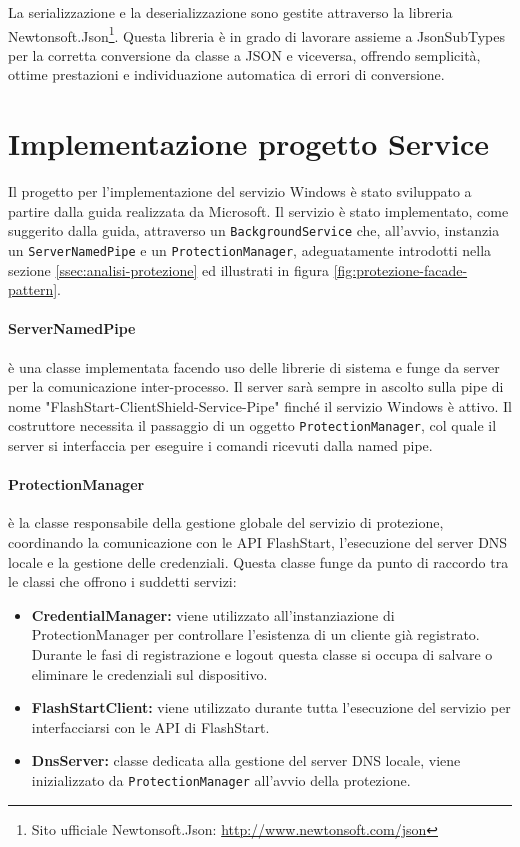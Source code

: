 \documentclass[12pt,a4paper,openright,twoside]{book}
\newcommand{\itemdef}[1]{\item \textbf{#1}}
\newcommand{\class}[1]{\texttt{#1}}
\begin{document}
La serializzazione e la deserializzazione sono gestite attraverso la libreria Newtonsoft.Json\footnote{Sito ufficiale Newtonsoft.Json: \url{http://www.newtonsoft.com/json}}. Questa libreria è in grado di lavorare assieme a JsonSubTypes per la corretta conversione da classe a JSON e viceversa, offrendo semplicità, ottime prestazioni e individuazione automatica di errori di conversione.

\section{Implementazione progetto Service}

Il progetto per l'implementazione del servizio Windows è stato sviluppato a partire dalla guida \cite{MicrosoftServices2021} realizzata da Microsoft.
Il servizio è stato implementato, come suggerito dalla guida, attraverso un \class{BackgroundService} che, all'avvio, instanzia un \class{ServerNamedPipe} e un \class{ProtectionManager}, adeguatamente introdotti nella sezione \ref{ssec:analisi-protezione} ed illustrati in figura \ref{fig:protezione-facade-pattern}.

\paragraph{ServerNamedPipe} è una classe implementata facendo uso delle librerie di sistema e funge da server per la comunicazione inter-processo.
Il server sarà sempre in ascolto sulla pipe di nome "FlashStart-ClientShield-Service-Pipe" finché il servizio Windows è attivo.
Il costruttore necessita il passaggio di un oggetto \class{ProtectionManager}, col quale il server si interfaccia per eseguire i comandi ricevuti dalla named pipe.

\paragraph{ProtectionManager} è la classe responsabile della gestione globale del servizio di protezione, coordinando la comunicazione con le API FlashStart, l'esecuzione del server \gls{DNS} locale e la gestione delle credenziali.
Questa classe funge da punto di raccordo tra le classi che offrono i suddetti servizi:
\begin{itemize}
	\itemdef{CredentialManager:} viene utilizzato all'instanziazione di {ProtectionManager} per controllare l'esistenza di un cliente già registrato.
	Durante le fasi di registrazione e logout questa classe si occupa di salvare o eliminare le credenziali sul dispositivo.
	
	\itemdef{FlashStartClient:} viene utilizzato durante tutta l'esecuzione del servizio per interfacciarsi con le API di FlashStart.
	
	\itemdef{DnsServer:} classe dedicata alla gestione del server \gls{DNS} locale, viene inizializzato da \class{ProtectionManager} all'avvio della protezione.
\end{itemize}
\end{document}
